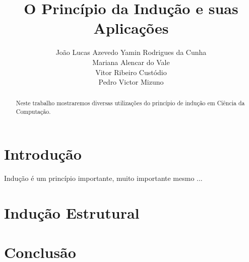 \documentclass[a4paper, 10pt]{article}
\title{\LARGE \bf
O Princípio da Indução e suas Aplicações
}
\author{João Lucas Azevedo Yamin Rodrigues da Cunha \\
		Mariana Alencar do Vale \\
        Vitor Ribeiro Custódio \\
        Pedro Victor Mizuno}
\begin{document}
\maketitle

\begin{abstract}

Neste trabalho mostraremos diversas utilizações do princípio de indução em Ciência da Computação.

\end{abstract}

\section{Introdução}

Indução é um princípio importante, muito importante mesmo ...


\section{Indução Estrutural}

\section{Conclusão}
\end{document}
